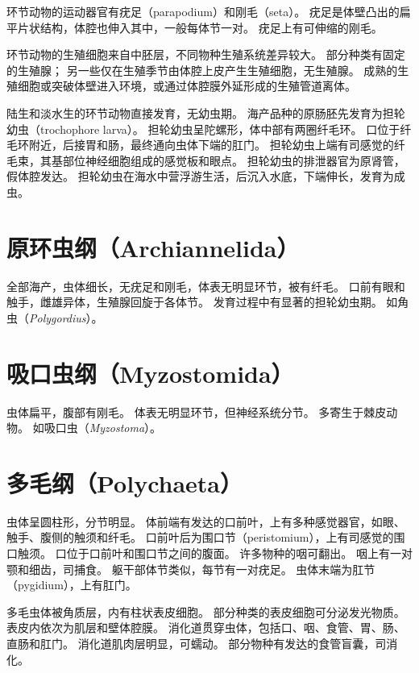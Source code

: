 \documentclass[11pt]{article}
\begin{document}
环节动物的运动器官有疣足（parapodium）和刚毛（seta）。
疣足是体壁凸出的扁平片状结构，体腔也伸入其中，一般每体节一对。
疣足上有可伸缩的刚毛。

\newline

环节动物的生殖细胞来自中胚层，不同物种生殖系统差异较大。
部分种类有固定的生殖腺；
另一些仅在生殖季节由体腔上皮产生生殖细胞，无生殖腺。
成熟的生殖细胞或突破体壁进入环境，或通过体腔膜外延形成的生殖管道离体。

\newline

陆生和淡水生的环节动物直接发育，无幼虫期。
海产品种的原肠胚先发育为担轮幼虫（trochophore larva）。
担轮幼虫呈陀螺形，体中部有两圈纤毛环。
口位于纤毛环附近，后接胃和肠，最终通向虫体下端的肛门。
担轮幼虫上端有司感觉的纤毛束，其基部位神经细胞组成的感觉板和眼点。
担轮幼虫的排泄器官为原肾管，假体腔发达。
担轮幼虫在海水中营浮游生活，后沉入水底，下端伸长，发育为成虫。
  
\section{原环虫纲（Archiannelida）}
全部海产，虫体细长，无疣足和刚毛，体表无明显环节，被有纤毛。
口前有眼和触手，雌雄异体，生殖腺回旋于各体节。
发育过程中有显著的担轮幼虫期。
如角虫（\textit{Polygordius}）。
  
\section{吸口虫纲（Myzostomida）}
虫体扁平，腹部有刚毛。
体表无明显环节，但神经系统分节。
多寄生于棘皮动物。
如吸口虫（\textit{Myzostoma}）。

\section{多毛纲（Polychaeta）}
虫体呈圆柱形，分节明显。
体前端有发达的口前叶，上有多种感觉器官，如眼、触手、腹侧的触须和纤毛。
口前叶后为围口节（peristomium），上有司感觉的围口触须。
口位于口前叶和围口节之间的腹面。
许多物种的咽可翻出。
咽上有一对颚和细齿，司捕食。
躯干部体节类似，每节有一对疣足。
虫体末端为肛节（pygidium），上有肛门。

\newline

多毛虫体被角质层，内有柱状表皮细胞。
部分种类的表皮细胞可分泌发光物质。
表皮内依次为肌层和壁体腔膜。
消化道贯穿虫体，包括口、咽、食管、胃、肠、直肠和肛门。
消化道肌肉层明显，可蠕动。
部分物种有发达的食管盲囊，司消化。
\end{document}
